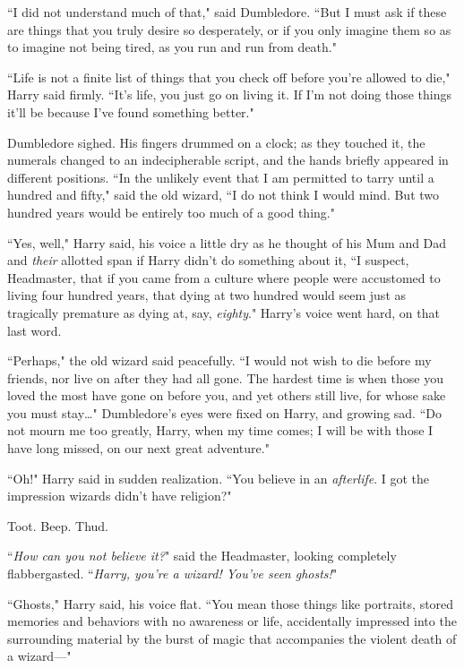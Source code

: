 ``I did not understand much of that," said Dumbledore. ``But I must ask if these are things that you truly desire so desperately, or if you only imagine them so as to imagine not being tired, as you run and run from death."

``Life is not a finite list of things that you check off before you're allowed to die," Harry said firmly. ``It's life, you just go on living it. If I'm not doing those things it'll be because I've found something better."

Dumbledore sighed. His fingers drummed on a clock; as they touched it, the numerals changed to an indecipherable script, and the hands briefly appeared in different positions. ``In the unlikely event that I am permitted to tarry until a hundred and fifty," said the old wizard, ``I do not think I would mind. But two hundred years would be entirely too much of a good thing."

``Yes, well," Harry said, his voice a little dry as he thought of his Mum and Dad and \emph{their} allotted span if Harry didn't do something about it, ``I suspect, Headmaster, that if you came from a culture where people were accustomed to living four hundred years, that dying at two hundred would seem just as tragically premature as dying at, say, \emph{eighty}." Harry's voice went hard, on that last word.

``Perhaps," the old wizard said peacefully. ``I would not wish to die before my friends, nor live on after they had all gone. The hardest time is when those you loved the most have gone on before you, and yet others still live, for whose sake you must stay{\ldots}" Dumbledore's eyes were fixed on Harry, and growing sad. ``Do not mourn me too greatly, Harry, when my time comes; I will be with those I have long missed, on our next great adventure."

``Oh!" Harry said in sudden realization. ``You believe in an \emph{afterlife}. I got the impression wizards didn't have religion?"

\later

Toot. Beep. Thud.

``\emph{How can you not believe it?}" said the Headmaster, looking completely flabbergasted. ``\emph{Harry, you're a wizard! You've seen ghosts!}"

``Ghosts," Harry said, his voice flat. ``You mean those things like portraits, stored memories and behaviors with no awareness or life, accidentally impressed into the surrounding material by the burst of magic that accompanies the violent death of a wizard—"

